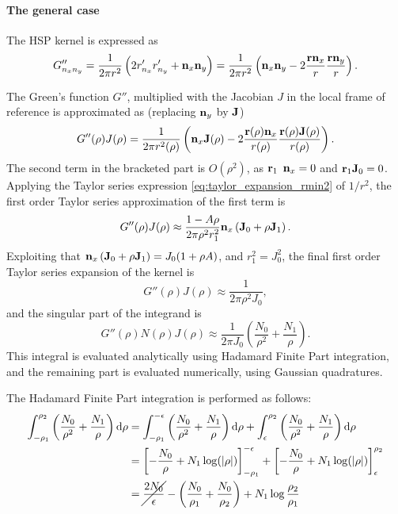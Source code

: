 \paragraph{The general case}

The HSP kernel is expressed as
%
\begin{equation}
	G''_{n_x n_y} = \frac{1}{2\pi r^2} \left( 2 r'_{n_x} r'_{n_y} + {\bf n}_x {\bf n}_y \right)
	= \frac{1}{2\pi r^2} \left( {\bf n}_x {\bf n}_y - 2 \frac{{\bf r} {\bf n}_x}{r} \frac{{\bf r}{\bf n}_y}{r} \right)
	.
\end{equation}
%

The Green's function $G''$, multiplied with the Jacobian $J$ in the local frame of reference is approximated as (replacing ${\bf n}_y$ by ${\bf J}$)
%
\begin{equation}
	G''(\rho) J(\rho)
	= \frac{1}{2\pi r^2(\rho)} \left( {\bf n}_x {\bf J}(\rho) - 2 \frac{{\bf r}(\rho) {\bf n}_x}{r(\rho)} \frac{{\bf r}(\rho) {\bf J}(\rho)}{r(\rho)}\right)
	.
\end{equation}
%
The second term in the bracketed part is $O(\rho^2)$, as ${\bf r}_1$ ${\bf n}_x = 0$ and ${\bf r}_1 {\bf J}_0 = 0$.
Applying the Taylor series expression \eqref{eq:taylor_expansion_rmin2} of $1/r^2$, the first order Taylor series approximation of the first term is
%
\begin{equation}
	G''(\rho) J(\rho) \approx \frac{1 - A \rho}{2\pi \rho^2 r_1^2} {\bf n}_x \left({\bf J}_0 + \rho {\bf J}_1\right) 
	.
\end{equation}
%
Exploiting that ${\bf n}_x \left({\bf J}_0 + \rho {\bf J}_1\right) = J_0 (1 + \rho A)$, and $r_1^2 = J_0^2$, the final first order Taylor series expansion of the kernel is
%
\begin{equation}
	G''(\rho) J(\rho) \approx \frac{1}{2\pi \rho^2 J_0}
	,
\end{equation}
%
and the singular part of the integrand is
%
\begin{equation}
	G''(\rho) N(\rho) J(\rho) \approx \frac{1}{2\pi J_0} \left( \frac{N_0}{\rho^2} +  \frac{N_1}{\rho} \right)
	.
\end{equation}
%
This integral is evaluated analytically using Hadamard Finite Part integration, and the remaining part is evaluated numerically, using Gaussian quadratures.

The Hadamard Finite Part integration is performed as follows:
%
\begin{align}
	\int_{-\rho_1}^{\rho_2} \left( \frac{N_0}{\rho^2} +  \frac{N_1}{\rho} \right) \mathrm{d} \rho
	&= \int_{-\rho_1}^{-\epsilon} \left( \frac{N_0}{\rho^2} +  \frac{N_1}{\rho} \right) \mathrm{d} \rho
	+ \int_{\epsilon}^{\rho_2} \left( \frac{N_0}{\rho^2} +  \frac{N_1}{\rho} \right) \mathrm{d} \rho \\
	&= \left[ -\frac{N_0}{\rho} +  N_1\log(|\rho|) \right]_{-\rho_1}^{-\epsilon} +
	\left[ -\frac{N_0}{\rho} +  N_1\log(|\rho|) \right]_{\epsilon}^{\rho_2} \\
	&=  \cancel{\frac{2 N_0}{\epsilon} }
	- \left( \frac{N_0}{\rho_1} + \frac{N_0}{\rho_2} \right)
	+  N_1\log \frac{\rho_2}{\rho_1} 
\end{align}


